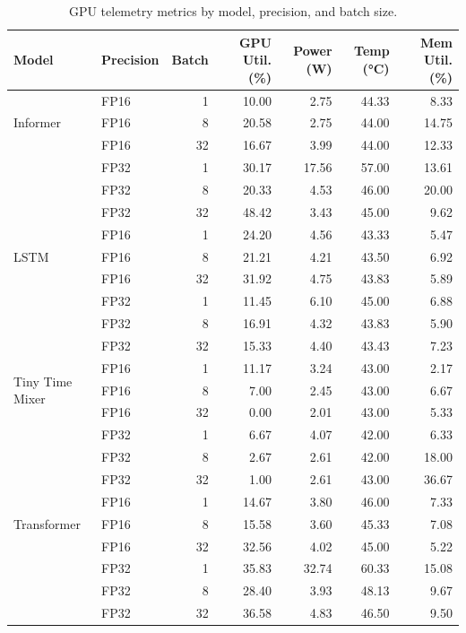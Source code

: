 \documentclass[10pt,a4paper]{article}
\begin{document}
\begin{table}[H]
\centering
\footnotesize
\caption{GPU telemetry metrics by model, precision, and batch size.}
\label{tab:telemetry}
\begin{tabular}{llrrrrr}
\toprule
Model & Precision & Batch & GPU Util. (\%) & Power (W) & Temp (°C) & Mem Util. (\%) \\
\midrule
\multirow{3}{*}{Informer} & FP16 & 1 & 10.00 & 2.75 & 44.33 & 8.33 \\
 & FP16 & 8 & 20.58 & 2.75 & 44.00 & 14.75 \\
 & FP16 & 32 & 16.67 & 3.99 & 44.00 & 12.33 \\
\midrule
 & FP32 & 1 & 30.17 & 17.56 & 57.00 & 13.61 \\
 & FP32 & 8 & 20.33 & 4.53 & 46.00 & 20.00 \\
 & FP32 & 32 & 48.42 & 3.43 & 45.00 & 9.62 \\
\midrule
\multirow{3}{*}{LSTM} & FP16 & 1 & 24.20 & 4.56 & 43.33 & 5.47 \\
 & FP16 & 8 & 21.21 & 4.21 & 43.50 & 6.92 \\
 & FP16 & 32 & 31.92 & 4.75 & 43.83 & 5.89 \\
\midrule
 & FP32 & 1 & 11.45 & 6.10 & 45.00 & 6.88 \\
 & FP32 & 8 & 16.91 & 4.32 & 43.83 & 5.90 \\
 & FP32 & 32 & 15.33 & 4.40 & 43.43 & 7.23 \\
\midrule
\multirow{3}{*}{Tiny Time Mixer} & FP16 & 1 & 11.17 & 3.24 & 43.00 & 2.17 \\
 & FP16 & 8 & 7.00 & 2.45 & 43.00 & 6.67 \\
 & FP16 & 32 & 0.00 & 2.01 & 43.00 & 5.33 \\
\midrule
 & FP32 & 1 & 6.67 & 4.07 & 42.00 & 6.33 \\
 & FP32 & 8 & 2.67 & 2.61 & 42.00 & 18.00 \\
 & FP32 & 32 & 1.00 & 2.61 & 43.00 & 36.67 \\
\midrule
\multirow{3}{*}{Transformer} & FP16 & 1 & 14.67 & 3.80 & 46.00 & 7.33 \\
 & FP16 & 8 & 15.58 & 3.60 & 45.33 & 7.08 \\
 & FP16 & 32 & 32.56 & 4.02 & 45.00 & 5.22 \\
\midrule
 & FP32 & 1 & 35.83 & 32.74 & 60.33 & 15.08 \\
 & FP32 & 8 & 28.40 & 3.93 & 48.13 & 9.67 \\
 & FP32 & 32 & 36.58 & 4.83 & 46.50 & 9.50 \\
\bottomrule
\end{tabular}
\end{table}
\end{document}
